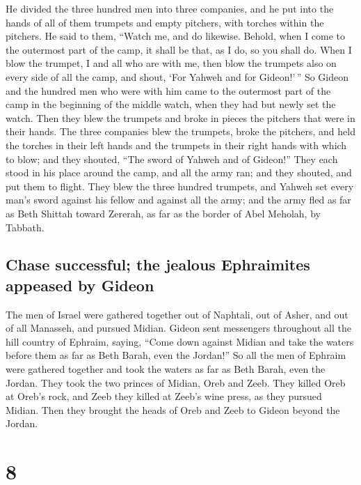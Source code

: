  He divided the three hundred men into three companies,
and he put into the hands of all of them trumpets and empty pitchers,
with torches within the pitchers.  He said to them,
``Watch me, and do likewise. Behold, when I come to the outermost part
of the camp, it shall be that, as I do, so you shall do. 
When I blow the trumpet, I and all who are with me, then blow the
trumpets also on every side of all the camp, and shout, `For Yahweh and
for Gideon!'\,''  So Gideon and the hundred men who were
with him came to the outermost part of the camp in the beginning of the
middle watch, when they had but newly set the watch. Then they blew the
trumpets and broke in pieces the pitchers that were in their hands.
 The three companies blew the trumpets, broke the
pitchers, and held the torches in their left hands and the trumpets in
their right hands with which to blow; and they shouted, ``The sword of
Yahweh and of Gideon!''  They each stood in his place
around the camp, and all the army ran; and they shouted, and put them to
flight.  They blew the three hundred trumpets, and Yahweh
set every man's sword against his fellow and against all the army; and
the army fled as far as Beth Shittah toward Zererah, as far as the
border of Abel Meholah, by Tabbath.

\hypertarget{chase-successful-the-jealous-ephraimites-appeased-by-gideon}{%
\subsection{Chase successful; the jealous Ephraimites appeased by
Gideon}\label{chase-successful-the-jealous-ephraimites-appeased-by-gideon}}

 The men of Israel were gathered together out of
Naphtali, out of Asher, and out of all Manasseh, and pursued Midian.
 Gideon sent messengers throughout all the hill country
of Ephraim, saying, ``Come down against Midian and take the waters
before them as far as Beth Barah, even the Jordan!'' So all the men of
Ephraim were gathered together and took the waters as far as Beth Barah,
even the Jordan.  They took the two princes of Midian,
Oreb and Zeeb. They killed Oreb at Oreb's rock, and Zeeb they killed at
Zeeb's wine press, as they pursued Midian. Then they brought the heads
of Oreb and Zeeb to Gideon beyond the Jordan.

\hypertarget{section-7}{%
\section{8}\label{section-7}}

